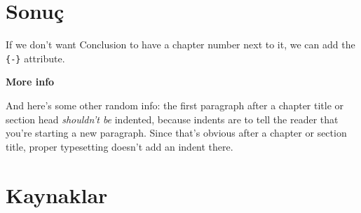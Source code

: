 \documentclass[12pt,twoside]{deuthesis}
\begin{document}
\hypertarget{sonuuxe7}{%
\chapter*{Sonuç}\label{sonuuxe7}}

If we don't want Conclusion to have a chapter number next to it, we can add the \texttt{\{-\}} attribute.

\textbf{More info}

And here's some other random info: the first paragraph after a chapter title or section head \emph{shouldn't be} indented, because indents are to tell the reader that you're starting a new paragraph. Since that's obvious after a chapter or section title, proper typesetting doesn't add an indent there.

\hypertarget{kaynaklar}{%
\chapter*{Kaynaklar}\label{kaynaklar}}

\end{document}
